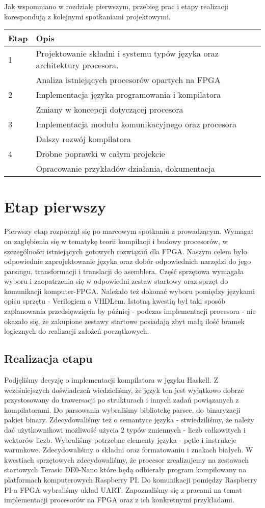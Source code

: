 Jak wspomniano w rozdziale pierwszym, przebieg prac i etapy realizacji korespondują z kolejnymi spotkaniami projektowymi.
\begin{table}[!ht]
\begin{tabular}{|l|l|} \hline
Etap & Opis\\ \hline
1 & Projektowanie składni i systemu typów języka oraz architektury procesora. \\
  & Analiza istniejących procesorów opartych na FPGA\\  \hline
2 & Implementacja języka programowania i kompilatora \\
  & Zmiany w koncepcji dotyczącej procesora\\ \hline
3 & Implementacja modułu komunikacyjnego oraz procesora\\
  & Dalszy rozwój kompilatora \\ \hline
4 & Drobne poprawki w całym projekcie\\
  & Opracowanie przykładów działania, dokumentacja\\
\hline
\end{tabular}
\end{table}

\section{Etap pierwszy}
Pierwszy etap rozpoczął się po marcowym spotkaniu z prowadzącym. Wymagał on zagłębienia się w tematykę teorii kompilacji i budowy procesorów, w szczególności istniejących gotowych rozwiązań dla FPGA. Naszym celem było odpowiednie zaprojektowanie języka oraz dobór odpowiednich narzędzi do jego parsingu, transformacji i translacji do asemblera. Część sprzętowa wymagała wyboru i zaopatrzenia się w odpowiedni zestaw startowy oraz sprzęt do komunikacji komputer-FPGA. Należało też dokonać wyboru pomiędzy językami opisu sprzętu - Verilogiem a VHDLem. Istotną kwestią był taki sposób zaplanowania przedsięwzięcia by później - podczas implementacji procesora - nie okazało się, że zakupione zestawy startowe posiadają zbyt małą ilość bramek logicznych do realizacji założeń początkowych.
\subsection{Realizacja etapu}
Podjęliśmy decyzję o implementacji kompilatora w języku Haskell. Z wcześniejszych doświadczeń wiedzieliśmy, że język ten jest wyjątkowo dobrze przystosowany do trawersacji po strukturach i innych zadań powiązanych z kompilatorami. Do parsowania wybraliśmy bibliotekę parsec, do binaryzacji pakiet binary. Zdecydowaliśmy też o semantyce języka - stwiedziliśmy, że należy dać użytkownikowi możliwość użycia 2 typów zmiennych - liczb całkowitych i wektorów liczb. Wybraliśmy potrzebne elementy języka - pętle i instrukcje warunkowe. Zdecydowaliśmy o składni oraz formatowaniu i znakach białych. W kwestiach sprzętowych zdecydowaliśmy, że procesor zrealizujemy na zestawach startowych Terasic DE0-Nano które będą odbierały program kompilowany na platformach komputerowych Raspberry PI. Do komunikacji pomiędzy Raspberry PI a FPGA wybraliśmy układ UART. Zapoznaliśmy się z pracami na temat implementacji procesorów na FPGA oraz z ich konkretnymi przykładami.  
